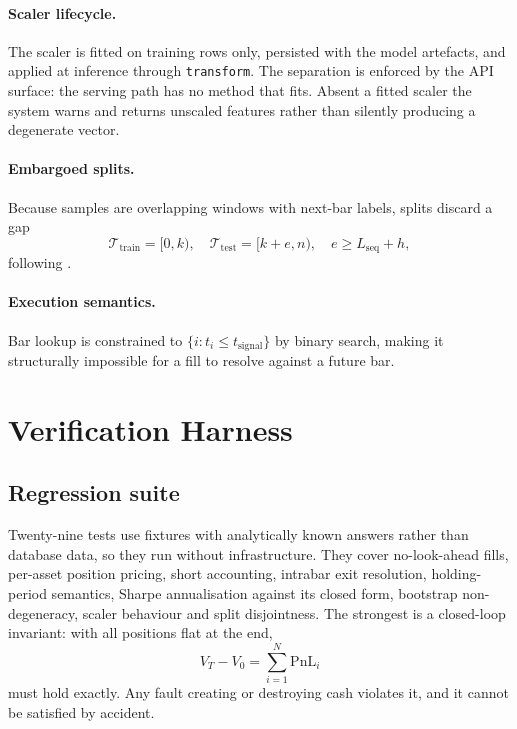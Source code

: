 \documentclass[preprint,12pt,authoryear]{elsarticle}
\begin{document}
\paragraph{Scaler lifecycle.} The scaler is fitted on training rows only,
persisted with the model artefacts, and applied at inference through
\texttt{transform}. The separation is enforced by the API surface: the serving
path has no method that fits. Absent a fitted scaler the system warns and returns
unscaled features rather than silently producing a degenerate vector.

\paragraph{Embargoed splits.} Because samples are overlapping windows with
next-bar labels, splits discard a gap
\begin{equation}
\mathcal{T}_{\text{train}} = [0, k), \quad
\mathcal{T}_{\text{test}} = [k + e, n), \quad e \ge L_{\text{seq}} + h,
\label{eq:embargo}
\end{equation}
following \citet{lopezdeprado2018advances}.

\paragraph{Execution semantics.} Bar lookup is constrained to
$\{i : t_i \le t_{\text{signal}}\}$ by binary search, making it structurally
impossible for a fill to resolve against a future bar.

\section{Verification Harness}
\label{sec:verification}

\subsection{Regression suite}

Twenty-nine tests use fixtures with analytically known answers rather than
database data, so they run without infrastructure. They cover no-look-ahead
fills, per-asset position pricing, short accounting, intrabar exit resolution,
holding-period semantics, Sharpe annualisation against its closed form, bootstrap
non-degeneracy, scaler behaviour and split disjointness. The strongest is a
closed-loop invariant: with all positions flat at the end,
\begin{equation}
V_T - V_0 = \sum_{i=1}^{N} \mathrm{PnL}_i
\label{eq:reconcile}
\end{equation}
must hold exactly. Any fault creating or destroying cash violates it, and it
cannot be satisfied by accident.
\end{document}
